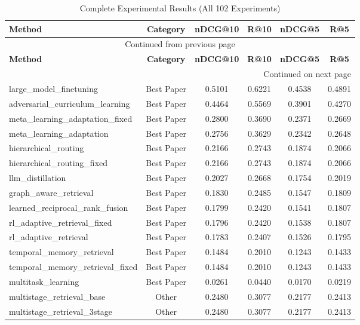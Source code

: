 \documentclass[11pt]{article}
\begin{document}
\begin{longtable}{lccccc}
\caption{Complete Experimental Results (All 102 Experiments)}
\label{tab:all_experiments} \\
\toprule
\textbf{Method} & \textbf{Category} & \textbf{nDCG@10} & \textbf{R@10} & \textbf{nDCG@5} & \textbf{R@5} \\
\midrule
\endfirsthead
\multicolumn{6}{c}{{Continued from previous page}} \\
\toprule
\textbf{Method} & \textbf{Category} & \textbf{nDCG@10} & \textbf{R@10} & \textbf{nDCG@5} & \textbf{R@5} \\
\midrule
\endhead
\bottomrule
\multicolumn{6}{r}{{Continued on next page}} \\
\endfoot
\bottomrule
\endlastfoot
large\_model\_finetuning & Best Paper & 0.5101 & 0.6221 & 0.4538 & 0.4891 \\
adversarial\_curriculum\_learning & Best Paper & 0.4464 & 0.5569 & 0.3901 & 0.4270 \\
meta\_learning\_adaptation\_fixed & Best Paper & 0.2800 & 0.3690 & 0.2371 & 0.2669 \\
meta\_learning\_adaptation & Best Paper & 0.2756 & 0.3629 & 0.2342 & 0.2648 \\
hierarchical\_routing & Best Paper & 0.2166 & 0.2743 & 0.1874 & 0.2066 \\
hierarchical\_routing\_fixed & Best Paper & 0.2166 & 0.2743 & 0.1874 & 0.2066 \\
llm\_distillation & Best Paper & 0.2027 & 0.2668 & 0.1754 & 0.2019 \\
graph\_aware\_retrieval & Best Paper & 0.1830 & 0.2485 & 0.1547 & 0.1809 \\
learned\_reciprocal\_rank\_fusion & Best Paper & 0.1799 & 0.2420 & 0.1541 & 0.1807 \\
rl\_adaptive\_retrieval\_fixed & Best Paper & 0.1796 & 0.2420 & 0.1538 & 0.1807 \\
rl\_adaptive\_retrieval & Best Paper & 0.1783 & 0.2407 & 0.1526 & 0.1795 \\
temporal\_memory\_retrieval & Best Paper & 0.1484 & 0.2010 & 0.1243 & 0.1433 \\
temporal\_memory\_retrieval\_fixed & Best Paper & 0.1484 & 0.2010 & 0.1243 & 0.1433 \\
multitask\_learning & Best Paper & 0.0261 & 0.0440 & 0.0170 & 0.0219 \\
multistage\_retrieval\_base & Other & 0.2480 & 0.3077 & 0.2177 & 0.2413 \\
multistage\_retrieval\_3stage & Other & 0.2480 & 0.3077 & 0.2177 & 0.2413 \\

\end{longtable}
\end{document}
